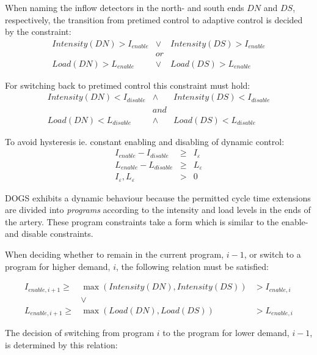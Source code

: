 When naming the inflow detectors in the north- and south ends $DN$ and $DS$, respectively, the transition from pretimed control to adaptive control is decided by the constraint:
\begin{eqnarray*}
Intensity(DN) > I_{enable} & \vee & Intensity(DS) > I_{enable} \\
& or & \\
Load(DN) > L_{enable} & \vee & Load(DS) > L_{enable}
\end{eqnarray*}

For switching back to pretimed control this constraint must hold:
\begin{eqnarray*}
Intensity(DN) < I_{disable} & \wedge & Intensity(DS) < I_{disable} \\
& and & \\
Load(DN) < L_{disable} & \wedge & Load(DS) < L_{disable}
\end{eqnarray*}

To avoid hysteresis ie. constant enabling and disabling of dynamic control:
\begin{eqnarray}
I_{enable} - I_{disable} & \geq & I_{\varepsilon} \label{eqn:hysteresis_intensity} \\ 
L_{enable} - L_{disable} & \geq & L_{\varepsilon} \label{eqn:hysteresis_load} \\
I_{\varepsilon},L_{\varepsilon} & > & 0 \label{eqn:hysteresis_limits}
\label{eqn:hysteresis}
\end{eqnarray}

DOGS exhibits a dynamic behaviour because the permitted cycle time extensions are divided into \textit{programs} according to the intensity and load levels in the ends of the artery. These program constraints take a form which is similar to the enable- and disable constraints.

When deciding whether to remain in the current program, $i-1$, or switch to a program for higher demand, $i$, the following relation must be satisfied:

\begin{eqnarray*}
I_{enable,i+1} \geq & \max(Intensity(DN),Intensity(DS)) & > I_{enable,i} \\
& \vee & \\
L_{enable,i+1} \geq & \max(Load(DN),Load(DS))  & > L_{enable,i}
\end{eqnarray*}

The decision of switching from program $i$ to the program for lower demand, $i-1$, is determined by this relation:

